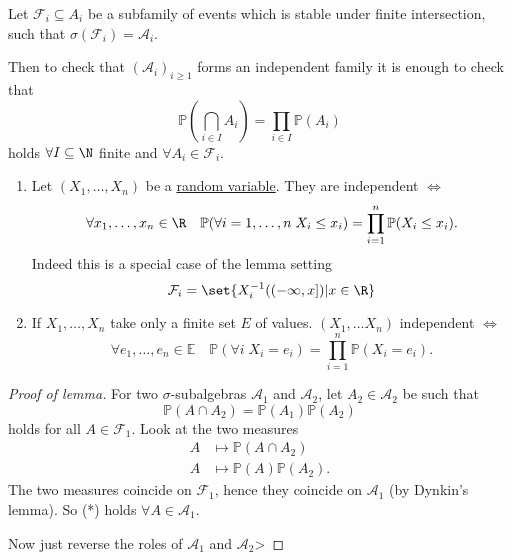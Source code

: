 \documentclass{article}
\newcommand{\1}[1]{\mathbbm{1}_{#1}}
\newcommand{\Prob}{\mathbb{P}}
\newcommand{\E}{\mathbb{E}}
\begin{document}
\begin{lemma}
    Let $\mathcal{F}_i \subseteq A_i$ be a subfamily of events which is stable under finite intersection, such that $\sigma(\mathcal{F}_i) = \mathcal{A}_i$.

    Then to check that $(\mathcal{A}_i)_{i \geq 1}$ forms an independent family it is enough to check that
    \begin{equation*}
        \Prob(\bigcap_{i \in I} A_i) = \prod_{i \in I} \Prob(A_i)
    \end{equation*}
    holds $\forall I \subseteq \N$ finite and $\forall A_i \in \mathcal{F}_i$.
\end{lemma}

\begin{eg}
    \begin{enumerate}[label=(\alph*)]
        \item Let $(X_1, \dotsc, X_n)$ be a \hyperlink{def:rv}{random variable}.
            They are independent $\iff$
            \begin{equation*}
                \forall x_1, \dotsc, x_n \in \R \quad \Prob(\forall i=1,\dotsc,n\; X_i \leq x_i) = \prod_{i=1}^n \Prob(X_i \leq x_i).
            \end{equation*}
            Indeed this is a special case of the lemma setting
            \begin{equation*}
                \mathcal{F}_i = \set{X_i^{-1}((-\infty, x]) | x \in \R}
            \end{equation*}
        \item If $X_1, \dotsc, X_n$ take only a finite set $E$ of values.
            $(X_1, \dotsc X_n)$ independent $\iff$
            \begin{equation*}
                \forall e_1, \dotsc, e_n \in \E \quad \Prob(\forall i \; X_i = e_i) = \prod_{i=1}^n \Prob(X_i = e_i).
            \end{equation*}
    \end{enumerate}
\end{eg}

\begin{proof}[Proof of lemma]
    For two $\sigma$-subalgebras $\mathcal{A}_1$ and $\mathcal{A}_2$, let $A_2 \in \mathcal{A}_2$ be such that
    \begin{equation*}
        \Prob(A \cap A_2) = \Prob(A_1) \Prob(A_2) \tag{*}
    \end{equation*}
    holds for all $A \in \mathcal{F}_1$.
    Look at the two measures
    \begin{align*}
        A &\longmapsto \Prob(A \cap A_2) \\
        A &\longmapsto \Prob(A) \Prob(A_2).
    \end{align*}
    The two measures coincide on $\mathcal{F}_1$, hence they coincide on $\mathcal{A}_1$ (by Dynkin's lemma).
    So (*) holds $\forall A \in \mathcal{A}_1$.

    Now just reverse the roles of $\mathcal{A}_1$ and $\mathcal{A}_2$>
\end{proof}
\end{document}
